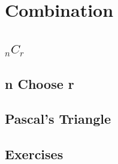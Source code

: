 \newpage
\section{Combination}
\noindent{}
\subsection{$_nC_r$}
\subsection{n Choose r}
\subsection{Pascal's Triangle}
\subsection{Exercises}

